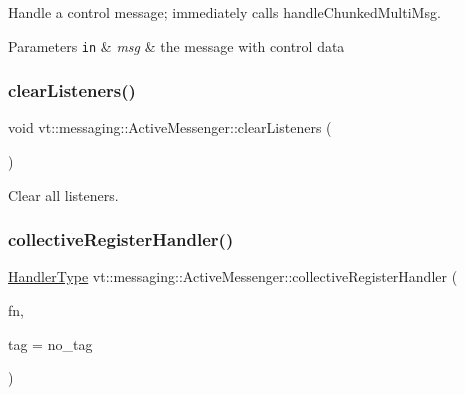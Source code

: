 Handle a control message; immediately calls {\ttfamily handle\+Chunked\+Multi\+Msg}. 


\begin{DoxyParams}[1]{Parameters}
\mbox{\tt in}  & {\em msg} & the message with control data \\
\hline
\end{DoxyParams}
\mbox{\label{structvt_1_1messaging_1_1_active_messenger_af7bcc5ce345c1138a67b6f80abb56705}} 
\subsubsection{\texorpdfstring{clear\+Listeners()}{clearListeners()}}
{\footnotesize\ttfamily void vt\+::messaging\+::\+Active\+Messenger\+::clear\+Listeners (\begin{DoxyParamCaption}{ }\end{DoxyParamCaption})\hspace{0.3cm}{\ttfamily [inline]}}



Clear all listeners. 

\mbox{\label{structvt_1_1messaging_1_1_active_messenger_a7e693e4b292e45fc1ed0dc8c9e2c03ec}} 
\subsubsection{\texorpdfstring{collective\+Register\+Handler()}{collectiveRegisterHandler()}}
{\footnotesize\ttfamily \hyperlink{namespacevt_af64846b57dfcaf104da3ef6967917573}{Handler\+Type} vt\+::messaging\+::\+Active\+Messenger\+::collective\+Register\+Handler (\begin{DoxyParamCaption}\item[{\hyperlink{namespacevt_a2a06c34cafcd511828f16cbf1476b924}{Active\+Closure\+Fn\+Type}}]{fn,  }\item[{\hyperlink{namespacevt_a84ab281dae04a52a4b243d6bf62d0e52}{Tag\+Type} const \&}]{tag = {\ttfamily no\+\_\+tag} }\end{DoxyParamCaption})}



